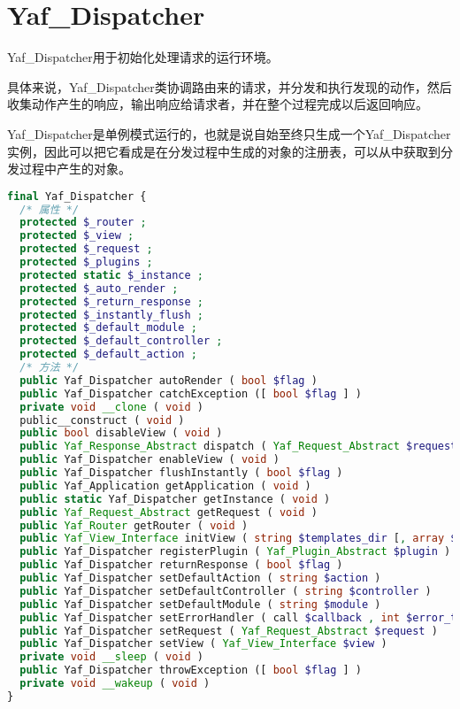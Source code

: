 \chapter{Yaf\_Dispatcher}

Yaf\_Dispatcher用于初始化处理请求的运行环境。

具体来说，Yaf\_Dispatcher类协调路由来的请求，并分发和执行发现的动作，然后收集动作产生的响应，输出响应给请求者，并在整个过程完成以后返回响应。

Yaf\_Dispatcher是单例模式运行的，也就是说自始至终只生成一个Yaf\_Dispatcher实例，因此可以把它看成是在分发过程中生成的对象的注册表，可以从中获取到分发过程中产生的对象。



\begin{lstlisting}[language=PHP]
final Yaf_Dispatcher {
  /* 属性 */
  protected $_router ;
  protected $_view ;
  protected $_request ;
  protected $_plugins ;
  protected static $_instance ;
  protected $_auto_render ;
  protected $_return_response ;
  protected $_instantly_flush ;
  protected $_default_module ;
  protected $_default_controller ;
  protected $_default_action ;
  /* 方法 */
  public Yaf_Dispatcher autoRender ( bool $flag )
  public Yaf_Dispatcher catchException ([ bool $flag ] )
  private void __clone ( void )
  public__construct ( void )
  public bool disableView ( void )
  public Yaf_Response_Abstract dispatch ( Yaf_Request_Abstract $request )
  public Yaf_Dispatcher enableView ( void )
  public Yaf_Dispatcher flushInstantly ( bool $flag )
  public Yaf_Application getApplication ( void )
  public static Yaf_Dispatcher getInstance ( void )
  public Yaf_Request_Abstract getRequest ( void )
  public Yaf_Router getRouter ( void )
  public Yaf_View_Interface initView ( string $templates_dir [, array $options ] )
  public Yaf_Dispatcher registerPlugin ( Yaf_Plugin_Abstract $plugin )
  public Yaf_Dispatcher returnResponse ( bool $flag )
  public Yaf_Dispatcher setDefaultAction ( string $action )
  public Yaf_Dispatcher setDefaultController ( string $controller )
  public Yaf_Dispatcher setDefaultModule ( string $module )
  public Yaf_Dispatcher setErrorHandler ( call $callback , int $error_types )
  public Yaf_Dispatcher setRequest ( Yaf_Request_Abstract $request )
  public Yaf_Dispatcher setView ( Yaf_View_Interface $view )
  private void __sleep ( void )
  public Yaf_Dispatcher throwException ([ bool $flag ] )
  private void __wakeup ( void )
}
\end{lstlisting}



